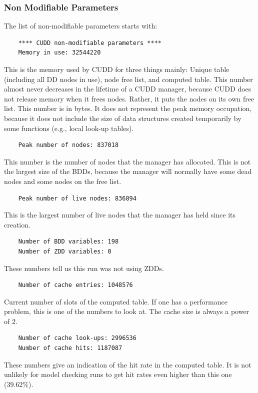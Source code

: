 \documentclass[11pt]{article}
\begin{document}
\subsubsection{Non Modifiable Parameters}
\label{sec:nonModPar}

The list of non-modifiable parameters starts with:
\begin{verbatim}
    **** CUDD non-modifiable parameters ****
    Memory in use: 32544220
\end{verbatim}
This is the memory used by CUDD for three things mainly: Unique table
(including all DD nodes in use), node free list, and computed table.
This number almost never decreases in the lifetime of a CUDD manager,
because CUDD does not release memory when it frees nodes.  Rather, it
puts the nodes on its own free list. This number is in bytes. It does
not represent the peak memory occupation, because it does not include
the size of data structures created temporarily by some functions (e.g.,
local look-up tables).

\begin{verbatim}
    Peak number of nodes: 837018
\end{verbatim}
This number is the number of nodes that the manager has allocated.
This is not the largest size of the BDDs, because the manager will
normally have some dead nodes and some nodes on the free list.

\begin{verbatim}
    Peak number of live nodes: 836894
\end{verbatim}
This is the largest number of live nodes that the manager has held
since its creation.

\begin{verbatim}
    Number of BDD variables: 198
    Number of ZDD variables: 0
\end{verbatim}
These numbers tell us this run was not using ZDDs.

\begin{verbatim}
    Number of cache entries: 1048576
\end{verbatim}
Current number of slots of the computed table.  If one has a
performance problem, this is one of the numbers to look at. The cache
size is always a power of 2.

\begin{verbatim}
    Number of cache look-ups: 2996536
    Number of cache hits: 1187087
\end{verbatim}
These numbers give an indication of the hit rate in the computed
table. It is not unlikely for model checking runs to get
hit rates even higher than this one (39.62\%).
\end{document}
